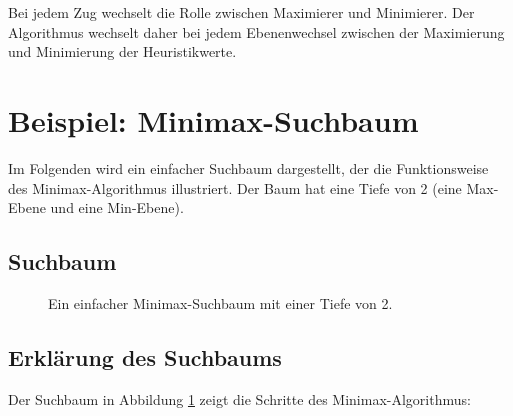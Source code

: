 Bei jedem Zug wechselt die Rolle zwischen Maximierer und Minimierer. Der Algorithmus wechselt daher bei jedem Ebenenwechsel zwischen der Maximierung und Minimierung der Heuristikwerte.

\section*{Beispiel: Minimax-Suchbaum}

Im Folgenden wird ein einfacher Suchbaum dargestellt, der die Funktionsweise des Minimax-Algorithmus illustriert. Der Baum hat eine Tiefe von 2 (eine Max-Ebene und eine Min-Ebene).

\subsection*{Suchbaum}

\begin{figure}[h!]
	\centering
	\caption{Ein einfacher Minimax-Suchbaum mit einer Tiefe von 2.}
	\label{fig:minimax-example}
\end{figure}

\subsection*{Erklärung des Suchbaums}

Der Suchbaum in Abbildung \ref{fig:minimax-example} zeigt die Schritte des Minimax-Algorithmus:

